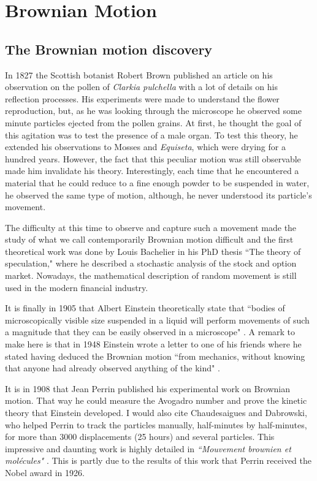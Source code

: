 \section{Brownian Motion}
\label{sec:chapter1}

\subsection{The Brownian motion discovery}



In 1827 the Scottish botanist Robert Brown published an article \cite{robert_xxvii_1828} on his observation on the pollen of \textit{Clarkia pulchella} with a lot of details on his reflection processes. His experiments were made to understand the flower reproduction, but, as he was looking through the microscope he observed some minute particles ejected from the pollen grains. At first, he thought the goal of this agitation was to test the presence of a male organ. To test this theory, he extended his observations to Mosses and \textit{Equiseta}, which were drying for a hundred years. However, the fact that this peculiar motion was still observable made him invalidate his theory. Interestingly, each time that he encountered a material that he could reduce to a fine enough powder to be suspended in water, he observed the same type of motion, although, he never understood its particle's movement.

The difficulty at this time to observe and capture such a movement made the study of what we call contemporarily Brownian motion difficult and the first theoretical work was done by Louis Bachelier in his PhD thesis ``The theory of speculation," where he described a stochastic analysis of the stock and option market. Nowadays, the mathematical description of random movement is still used in the modern financial industry. 

It is finally in 1905 that Albert Einstein theoretically state that ``bodies of microscopically visible size suspended in a liquid will perform movements of such a magnitude that they can be easily observed in a microscope" \cite{einstein_uber_1905}. A remark to make here is that in 1948 Einstein wrote a letter to one of his friends where he stated having deduced the Brownian motion ``from mechanics, without knowing that anyone had already observed anything of the kind" \cite{peter_brownian_nodate}.

It is in 1908 that Jean Perrin published his experimental work on Brownian motion. That way he could measure the Avogadro number and prove the kinetic theory that Einstein developed. I would also cite Chaudesaigues and Dabrowski, who helped Perrin to track the particles manually, half-minutes by half-minutes, for more than 3000 displacements (25 hours) and several particles. This impressive and daunting work is highly detailed in \textit{``Mouvement brownien et molécules"} \cite{perrin_mouvement_1910}. This is partly due to the results of this work that Perrin received the Nobel award in 1926.


